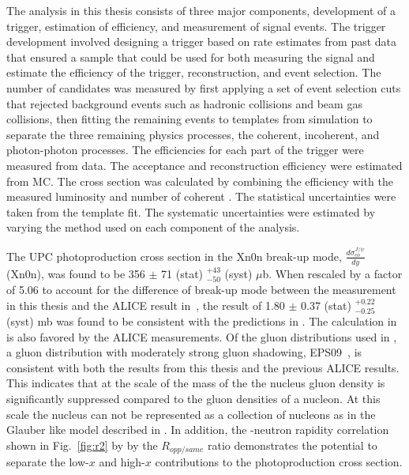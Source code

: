     The analysis in this thesis consists of three major components, development
      of a trigger, estimation of efficiency, and measurement of signal events.
    The trigger development involved designing a trigger based on rate estimates
      from past data that ensured a sample that could be used for both measuring
      the signal and estimate the efficiency of the trigger, reconstruction, and
      event selection.
    The number of \JPsi{} candidates was measured by first applying a set 
      of event selection cuts that rejected background events such as hadronic
      collisions and beam gas collisions, then fitting the remaining events to
      templates from simulation to separate the three remaining physics processes,
      the coherent, incoherent, and photon-photon processes. 
    The efficiencies for each part of the trigger were measured from data. 
    The acceptance and reconstruction efficiency were estimated from MC.
    The cross section was calculated by combining the efficiency with the 
      measured luminosity and number of coherent \JPsi{}.
    The statistical uncertainties were taken from the template fit.
    The systematic uncertainties were estimated by varying the method used on 
      each component of the analysis. 
  
    The UPC \JPsi{} photoproduction cross section in the Xn0n break-up mode, $\frac{d\sigma^{J/\psi}_{co}}{dy}$ (Xn0n),
      was found to be 356 $\pm$ 71 (stat) $^{+43}_{-50}$ (syst) $\mu$b. 
    When rescaled by a factor of 5.06 to account for the difference of break-up mode between 
      the measurement in this thesis and the ALICE result in~\cite{Abelev:2012ba,Abbas:2013oua}, the 
      result of 1.80 $\pm$ 0.37 (stat) $^{+0.22}_{-0.25}$ (syst) mb was found to be consistent with the 
      predictions in \cite{pQCD2013.02}.  
    The calculation in \cite{pQCD2013.02} is also favored by the ALICE measurements. 
    Of the gluon distributions used in \cite{pQCD2013.02}, a gluon distribution with 
      moderately strong gluon shadowing, EPS09~\cite{Eskola:2009uj}, is consistent with both the results from this
      thesis and the previous ALICE results. 
    This indicates that at the scale of the mass of the \JPsi{} the nucleus gluon density is 
      significantly suppressed compared to the gluon densities of a nucleon.
    At this scale the nucleus can not be represented as a collection of nucleons as in the 
      Glauber like model described in \cite{vmd1999}.
    In addition, the \JPsi{}-neutron rapidity correlation shown in Fig.~\ref{fig:r2} by 
      by the $R_{opp/same}$ ratio demonstrates the potential to separate the low-$x$ 
      and high-$x$ contributions to the photoproduction cross section.
  
